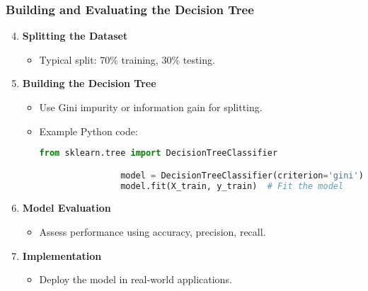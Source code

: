 \documentclass[aspectratio=169]{beamer}
\begin{document}
\begin{frame}[fragile]
    \frametitle{Building and Evaluating the Decision Tree}
    \begin{enumerate}[resume]
        \setcounter{enumi}{3}
        \item \textbf{Splitting the Dataset}
            \begin{itemize}
                \item Typical split: 70\% training, 30\% testing.
            \end{itemize}

        \item \textbf{Building the Decision Tree}
            \begin{itemize}
                \item Use Gini impurity or information gain for splitting.
                \item Example Python code:
                \begin{lstlisting}[language=Python]
                from sklearn.tree import DecisionTreeClassifier

                model = DecisionTreeClassifier(criterion='gini') # Gini criterion
                model.fit(X_train, y_train)  # Fit the model
                \end{lstlisting}
            \end{itemize}
        
        \item \textbf{Model Evaluation}
            \begin{itemize}
                \item Assess performance using accuracy, precision, recall.
            \end{itemize}

        \item \textbf{Implementation}
            \begin{itemize}
                \item Deploy the model in real-world applications.
            \end{itemize}
    \end{enumerate}
\end{frame}
\end{document}
